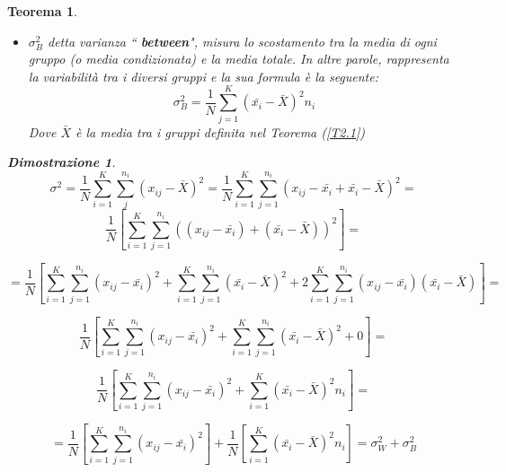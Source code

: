 \documentclass{article}
\newtheorem{teorema}{Teorema}[section]
\newtheorem{dimostrazione}{Dimostrazione}
\begin{document}
\begin{itemize}
\begin{itemize}
\begin{teorema}
\begin{itemize}
                            \item $\sigma^2_B$ detta varianza ``\textbf{ between}", misura lo scostamento tra la media di ogni gruppo (o media condizionata) e la media totale. In altre parole, rappresenta la variabilità tra i diversi gruppi e la sua formula è la seguente:
                            $$ \sigma^2_B=\frac{1}{N}\sum_{j=1}^{K}(\bar{x_i} -\bar{X})^2n_i$$
                            Dove $\bar{X}$ è la media tra i gruppi definita nel Teorema (\ref{T2.1})
                        \end{itemize}{}
                        
                    
                         \begin{dimostrazione}
                                $$ \sigma^2 =  \frac{1}{N}\sum_{i=1}^{K}\sum_{j}^{n_i}(x_{ij}-\bar{X})^2 
                            =\frac{1}{N}\sum_{i=1}^{K}\sum_{j=1}^{n_i}(x_{ij}-\bar{x_i}+\bar{x_i}-\bar{X})^2=$$
                         $$\frac{1}{N}\left[\sum_{i=1}^{K} \sum_{j=1}^{n_i} ((x_{ij}-\bar{x_i}) + (\bar{x_i}-\bar{X}))^2 \right] = $$
                    
                         $$  = \frac{1}{N}\left[\sum_{i=1}^{K} \sum_{j=1}^{n_i} (x_{ij}-\bar{x_i})^2
                            + \sum_{i=1}^{K} \sum_{j=1}^{n_i}(\bar{x_i}-\bar{X})^2 + 
                            2 \sum_{i=1}^{K} \sum_{j=1}^{n_i}(x_{ij}-\bar{x_i}) (\bar{x_i}-\bar{X}) \right] =$$
                            
                            
                        $$ \frac{1}{N}\left[\sum_{i=1}^{K} \sum_{j=1}^{n_i} (x_{ij}-\bar{x_i})^2
                            + \sum_{i=1}^{K} \sum_{j=1}^{n_i}(\bar{x_i}-\bar{X})^2 +0 \right]=$$
                           
                           $$ 
                          \frac{1}{N}\left[\sum_{i=1}^{K} \sum_{j=1}^{n_i} (x_{ij}-\bar{x_i})^2
                            + \sum_{i=1}^{K}(\bar{x_i}-\bar{X})^2 n_i\right] = 
                            $$
                            
                            $$ =   \frac{1}{N}\left[\sum_{i=1}^{K} \sum_{j=1}^{n_i} (x_{ij}-\bar{x_i})^2 \right] +
                                     \frac{1}{N}\left[\sum_{i=1}^{K}(\bar{x_i}-\bar{X})^2 n_i\right] = 
                               \sigma^2_W + \sigma^2_B 
                            $$
                            \end{dimostrazione}
                        \end{teorema}
                           

\end{itemize}
\end{itemize}
\end{document}
